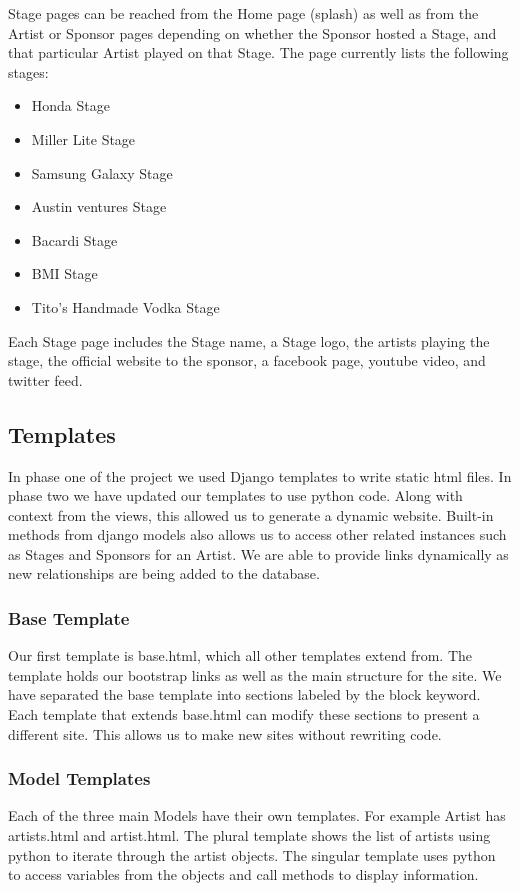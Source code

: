 \documentclass[12pt,english]{scrartcl}
\begin{document}
Stage pages can be reached from the Home page (splash) as well as from the Artist or Sponsor pages depending on whether the Sponsor hosted a
Stage, and that particular Artist played on that Stage. The page currently lists the following stages:
\begin{itemize}
 \item Honda Stage
 \item Miller Lite Stage
 \item Samsung Galaxy Stage
 \item Austin ventures Stage
 \item Bacardi Stage
 \item BMI Stage
 \item Tito's Handmade Vodka Stage
\end{itemize}
Each Stage page includes the Stage name, a Stage logo, the artists playing the stage, the official website to the sponsor,
a facebook page, youtube video, and twitter feed.

\subsection{Templates}
In phase one of the project we used Django templates to write static html files. In phase two we have updated our templates to use python code. Along with context from the views,
this allowed us to generate a dynamic website. Built-in methods from django models also allows us to access other related instances such as Stages and Sponsors for an Artist. We are able to 
provide links dynamically as new relationships are being added to the database.

\subsubsection{Base Template}
Our first template is base.html, which all other templates extend from. The template holds our bootstrap links as well as the main structure for the site.
We have separated the base template into sections labeled by the block keyword. Each template that extends base.html
can modify these sections to present a different site. This allows us to make new sites without rewriting code.

\subsubsection{Model Templates}
Each of the three main Models have their own templates. For example Artist has artists.html and artist.html. The plural template shows the list of artists using python to
iterate through the artist objects. The singular template uses python to access variables from the objects and call methods to display information.
\end{document}
